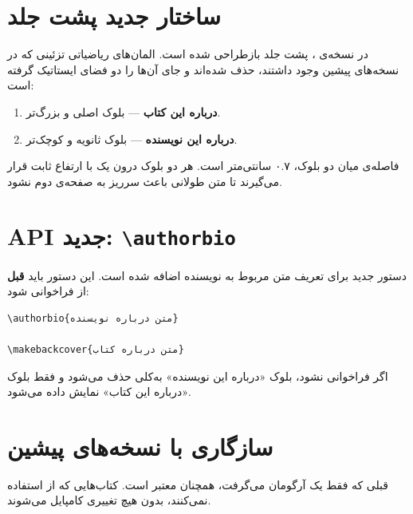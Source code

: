 \documentclass{matinbook}
\begin{document}
\section{ساختار جدید پشت جلد}
\label{sec:backcover-structure}

در نسخه‌ی \lr{\matinbookversion}، پشت جلد بازطراحی شده است.
المان‌های ریاضیاتی تزئینی که در نسخه‌های پیشین وجود داشتند،
حذف شده‌اند و جای آن‌ها را دو فضای ایستاتیک گرفته است:

\begin{enumerate}
    \item \textbf{درباره این کتاب} — بلوک اصلی و بزرگ‌تر.
    \item \textbf{درباره این نویسنده} — بلوک ثانویه و کوچک‌تر.
\end{enumerate}

فاصله‌ی میان دو بلوک، ۰.۷ سانتی‌متر است. هر دو بلوک درون
یک  با ارتفاع ثابت قرار می‌گیرند تا متن طولانی
باعث سرریز به صفحه‌ی دوم نشود.

\section{API جدید: \texttt{\textbackslash authorbio}}
\label{sec:backcover-authorbio}

دستور جدید  برای تعریف
متن مربوط به نویسنده اضافه شده است. این دستور باید
\textbf{قبل} از  فراخوانی شود:

\begin{latin}
\begin{verbatim}
\authorbio{متن درباره نویسنده}

\makebackcover{متن درباره کتاب}
\end{verbatim}
\end{latin}

اگر  فراخوانی نشود، بلوک
«درباره این نویسنده» به‌کلی حذف می‌شود و فقط بلوک
«درباره این کتاب» نمایش داده می‌شود.

\section{سازگاری با نسخه‌های پیشین}
\label{sec:backcover-compat}

 قبلی  که
فقط یک آرگومان می‌گرفت، همچنان معتبر است. کتاب‌هایی که
از  استفاده نمی‌کنند، بدون
هیچ تغییری کامپایل می‌شوند.

\end{document}
